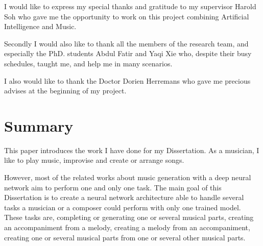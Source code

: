 \documentclass[12pt]{report}
\begin{document}
I would like to express my special thanks and gratitude to my supervisor Harold Soh who gave me the opportunity to work on this project combining Artificial Intelligence and Music.

Secondly I would also like to thank all the members of the research team, and especially the PhD. students Abdul Fatir and Yaqi Xie who, despite their busy schedules, taught me, and help me in many scenarios.

I also would like to thank the Doctor Dorien Herremans who gave me precious advises at the beginning of my project.

\newpage
\tableofcontents
\newpage


\setlength{\parindent}{0.6cm}


\chapter*{Summary}

This paper introduces the work I have done for my Dissertation.
As a musician, I like to play music, improvise and create or arrange songs.

However, most of the related works about music generation with a deep neural network aim to perform one and only one task.
The main goal of this Dissertation is to create a neural network architecture able to handle several tasks a musician or a composer could perform with only one trained model.
These tasks are, completing or generating one or several musical parts, creating an accompaniment from a melody, creating a melody from an accompaniment, creating one or several musical parts from one or several other musical parts.
\end{document}
